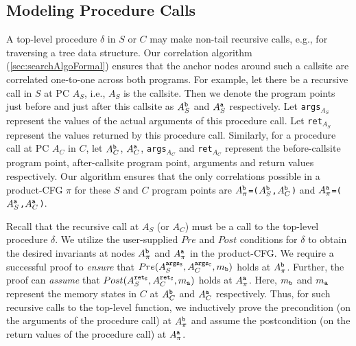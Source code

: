 
\subsection{Modeling Procedure Calls}
\label{sec:modelfcalls}
A top-level procedure $\delta$
in $S$ or $C$ may make non-tail recursive
calls, e.g., for traversing
a tree data structure.
Our correlation algorithm (\cref{sec:searchAlgoFormal}) ensures
that the anchor nodes around such a callsite are correlated
one-to-one across both programs. For example, let there be a
recursive call in $S$ at PC $A_S$, i.e., $A_S$ is the callsite.
Then we denote the program points just before and just
after this callsite
as $A^{{\tt b}}_S$ and $A^{{\tt a}}_S$ respectively.
Let {\tt args$_{A_S}$}
represent the values of the
actual arguments of this procedure call.
Let {\tt ret$_{A_S}$} represent the values returned by this procedure call.
Similarly, for a procedure call at PC $A_C$ in $C$, let
$A^{{\tt b}}_C$,
$A^{{\tt a}}_C$,
{\tt args$_{A_C}$} and {\tt ret$_{A_C}$} 
represent the before-callsite program point, after-callsite program point,
arguments and return values respectively.
Our algorithm ensures that the only correlations possible in
a product-CFG $\pi$ for these $S$ and $C$ program points are
{\tt $A_{\pi}^{{\tt b}}$=($A_{S}^{{\tt b}}$,$A_{C}^{{\tt b}}$)}
and
{\tt $A_{\pi}^{{\tt a}}$=($A_{S}^{{\tt a}}$,$A_{C}^{{\tt a}}$)}.

Recall that the recursive call at $A_S$ (or $A_C$) must
be a call to the top-level procedure $\delta$.
We utilize the user-supplied $Pre$ and $Post$ conditions for $\delta$ to obtain
the desired invariants at nodes $A_{\pi}^{{\tt b}}$
and 
$A_{\pi}^{{\tt a}}$ in the product-CFG.
We require a successful proof to
{\em ensure} that {\small $Pre(A^{{\tt args_S}}_S, A^{{\tt args_C}}_C, m_{\tt b})$}
holds at $A_{\pi}^{{\tt b}}$.  Further, the proof can
{\em assume} that {\small $Post(A^{{\tt ret_S}}_S, A^{{\tt ret_C}}_C, m_{\tt a})$} holds
at 
$A_{\pi}^{{\tt a}}$. Here, $m_{\tt b}$
and $m_{\tt a}$ represent the memory states in $C$ at
$A^{{\tt b}}_C$ and
$A^{{\tt a}}_C$ respectively.
Thus, for such recursive calls to the
top-level function, we inductively
prove the precondition (on the
arguments of the procedure call) at $A_{\pi}^{{\tt b}}$
and assume the postcondition (on the return values of the procedure call)
at $A_{\pi}^{{\tt a}}$.